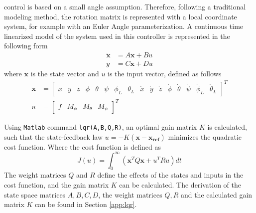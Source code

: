  control is based on a small angle assumption. 
Therefore, following a traditional modeling method, the rotation matrix is represented with a local coordinate system, 
for example with an Euler Angle parameterization. 
A continuous time linearized model of the system used in this controller is represented in the following form 
\begin{align}\label{eq:ss}
\mathbf{\dot{x} }&=A\mathbf{x}+Bu\\
y&=C\mathbf{x}+Du
\end{align}
where $ \mathbf{x} $ is the state vector and $ u $ is the input vector, defined as follows
\begin{align}\label{eq:state}
\mathbf{x}&=\begin{bmatrix}
x&y&z&\phi&\theta&\psi&\phi_L&\theta_L&\dot{x}&\dot{y}&\dot{z}&\dot{\phi}&\dot{\theta}&\dot{\psi}&\dot{\phi}_L&\dot{\theta}_L
\end{bmatrix}^T\\
u&=\begin{bmatrix}
f&M_\phi&M_\theta&M_\psi
\end{bmatrix}^T
\end{align}

Using \texttt{Matlab} command \texttt{lqr(A,B,Q,R)}, an optimal gain matrix $ K $ is calculated, such that the state-feedback law $ u=-K(\mathbf{x-x_{ref}}) $ \cite{Reyes-Valeria2013} minimizes the quadratic cost function. Where the cost function is defined as 
\begin{equation}\label{key}
J(u)=\int_{0}^{\infty}(\mathbf{x}^TQ\mathbf{x}+u^TRu)dt
\end{equation}
The weight matrices $ Q $ and $ R $ define the effects of the states and inputs in the cost function, and the gain matrix $K $ can be calculated. 
The derivation of the state space matrices $ A, B, C, D $, the weight matrices $ Q,R $ and the calculated gain matrix $ K $ can be found in Section \ref{app:lqr}. 


